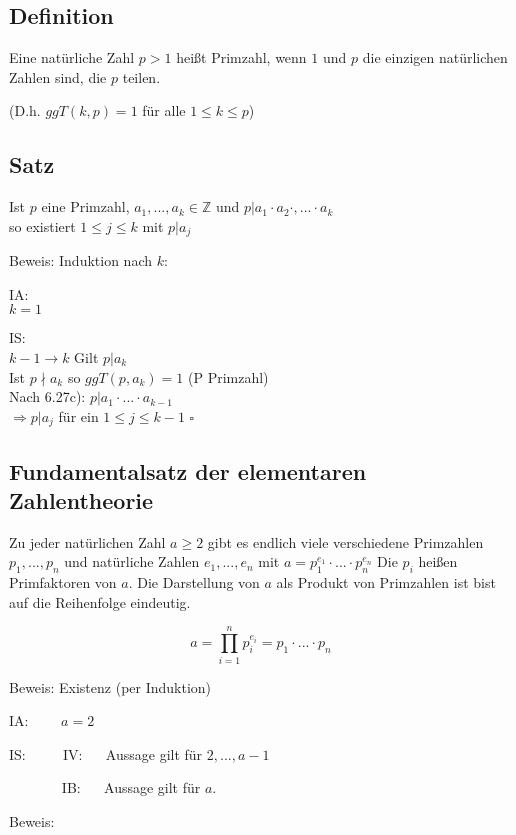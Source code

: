 \documentclass[a4paper, 12pt, twoside] {article}
\begin{document}
\subsection[Definition (Primzahl)]{Definition} %
Eine natürliche Zahl $p > 1$ heißt Primzahl, wenn $1$ und $p$ die einzigen natürlichen Zahlen sind,
die $p$ teilen.

(D.h. $ggT(k, p) = 1$ für alle $1 \leq k \leq p$)

\subsection{Satz} %
Ist $p$ eine Primzahl, $a_1, ... ,a_k \in \mathbb{Z}$ und $p | a_1 \cdot a_2 \cdot, ... \cdot a_k$ \\
so existiert $1 \leq j \leq k$ mit $p | a_j$

Beweis: Induktion nach $k$:

IA: \\
$k = 1$ \checkmark

IS: \\
$k -1 \rightarrow k$ Gilt $p | a_k$ \checkmark \\
Ist $p \nmid a_k$ so $ggT(p, a_k) = 1$ (P Primzahl) \\
Nach 6.27c): $p | a_1 \cdot ... \cdot a_{k-1}$ \\
$\Rightarrow p | a_j$ für ein $1 \leq j \leq k - 1$ \hfill $\square$

\subsection{Fundamentalsatz der elementaren Zahlentheorie}
Zu jeder natürlichen Zahl $a \geq 2$ gibt es endlich viele
verschiedene Primzahlen $p_1, ... ,p_n$ und natürliche Zahlen $e_1, ... ,e_n$ mit
$a = p_{1}^{e_1} \cdot ... \cdot p_{n}^{e_n}$
Die $p_i$ heißen Primfaktoren von $a$. Die Darstellung von $a$ als Produkt von Primzahlen
ist bist auf die Reihenfolge eindeutig.


$$a = \prod_{i=1}^{n} p^{e_i}_i = p_1 \cdot ... \cdot p_n$$

Beweis: Existenz (per Induktion)

IA: $\qquad a = 2$ \checkmark

IS: $\qquad$ IV: $\quad$ Aussage gilt für $2, ..., a-1$

$\qquad\quad\ \ $ IB: $\quad$ Aussage gilt für $a$.

Beweis:
\end{document}
